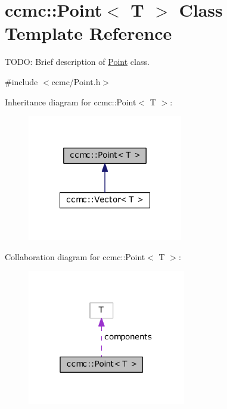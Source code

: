 \hypertarget{classccmc_1_1_point}{\section{ccmc\-:\-:Point$<$ T $>$ Class Template Reference}
\label{classccmc_1_1_point}
}


T\-O\-D\-O\-: Brief description of \hyperlink{classccmc_1_1_point}{Point} class.  




{\ttfamily \#include $<$ccmc/\-Point.\-h$>$}



Inheritance diagram for ccmc\-:\-:Point$<$ T $>$\-:\nopagebreak
\begin{figure}[H]
\begin{center}
\leavevmode
\includegraphics[width=192pt]{classccmc_1_1_point__inherit__graph}
\end{center}
\end{figure}


Collaboration diagram for ccmc\-:\-:Point$<$ T $>$\-:\nopagebreak
\begin{figure}[H]
\begin{center}
\leavevmode
\includegraphics[width=196pt]{classccmc_1_1_point__coll__graph}
\end{center}
\end{figure}
